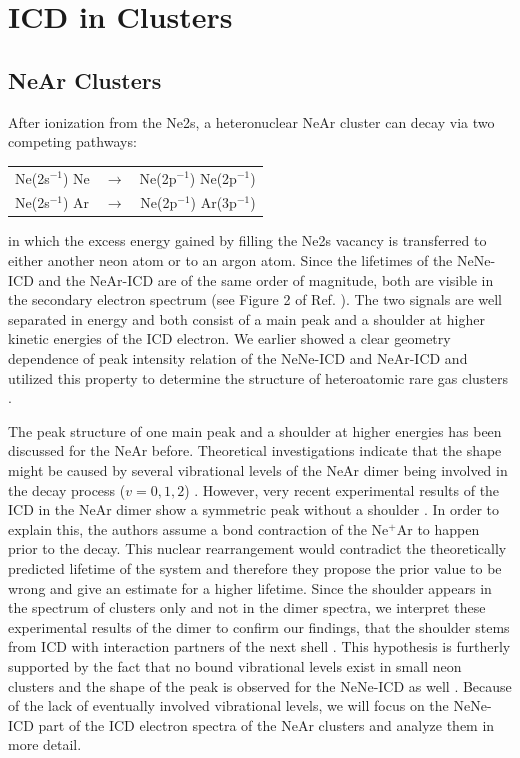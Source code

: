 \section{ICD in Clusters}
\label{sec:clusters}

\subsection{NeAr Clusters}
\label{sec:near}
After ionization from the Ne2s, a heteronuclear NeAr cluster can decay
via two competing pathways:

\begin{center}
\begin{tabular}{lcr}
 Ne(2s$^{-1}$) Ne &$\rightarrow$ & Ne(2p$^{-1}$) Ne(2p$^{-1}$)\\
 Ne(2s$^{-1}$) Ar &$\rightarrow$ & Ne(2p$^{-1}$) Ar(3p$^{-1}$)
\end{tabular}
\end{center}

in which the excess energy gained by filling the Ne2s vacancy is transferred to
either another neon atom or to an argon atom. Since the lifetimes of the
NeNe-ICD and the NeAr-ICD are of the same order of magnitude, both are
visible in the secondary electron spectrum (see Figure 2 of
Ref. \cite{Fasshauer14_1}). The two signals are well separated in energy
and both consist of a main peak and a shoulder at higher kinetic energies
of the ICD electron.
We earlier showed a clear
geometry dependence of peak intensity relation of the NeNe-ICD and NeAr-ICD
and utilized this property to determine the structure of
heteroatomic rare gas clusters \cite{Fasshauer14_1}.

The peak structure of one main peak and a shoulder at higher energies has been
discussed for the NeAr before. Theoretical investigations indicate that the
shape might be caused by several vibrational levels of the NeAr dimer
being involved in the decay process ($v=0,1,2$) \cite{Scheit06}. However, very
recent experimental results of the ICD in the NeAr dimer show a symmetric peak
without a shoulder \cite{OKeeffe14}. In order to explain this, the authors assume
a bond contraction of the Ne$^+$Ar to happen prior to the decay.
This nuclear rearrangement would contradict the
theoretically predicted lifetime of the system and therefore they propose
the prior value to be wrong and give an estimate for a higher lifetime.
Since the shoulder appears in the spectrum of clusters only and not in the
dimer spectra, we interpret these experimental results of the dimer to confirm our
findings, that the shoulder stems from ICD with interaction partners of the
next shell \cite{Fasshauer14_1}. This hypothesis is furtherly supported by the
fact that no bound vibrational levels exist in small neon clusters and the
shape of the peak is observed for the NeNe-ICD as well \cite{}.
Because of the lack of eventually involved vibrational levels, we will
focus on the NeNe-ICD part of the ICD electron spectra of the NeAr clusters
and analyze them in more detail.

